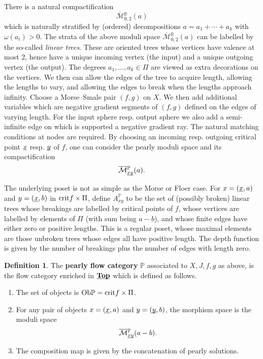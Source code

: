 \documentclass[reqno, 10pt]{amsart}
\numberwithin{equation}{section}
\numberwithin{equation}{section}
\theoremstyle{definition}
\newtheorem{defn}[thm]{Definition}
\theoremstyle{remark}
\newcommand{\beqn}{\begin{equation*}}
\newcommand{\eeqn}{\end{equation*}}
\newcommand{\ov}{\overline}
\newcommand{\mb}{\mathbb}
\newcommand{\mc}{\mathcal}
\newcommand{\uds}[1]{\underline{\smash{#1}}}
\begin{document}
There is a natural compactification 
\beqn
\ov{\mc M}{}_{0,2}^{\mb R}(a)
\eeqn
which is naturally stratified by (ordered) decompositions $a = a_1 + \cdots + a_k$ with $\omega(a_i)>0$. The strata of the above moduli space $\ov{\mc M}{}_{0,2}^{\mb R}(a)$ can be labelled by the so-called {\it linear trees}. These are oriented trees whose vertices have valence at most 2, hence have a unique incoming vertex (the input) and a unique outgoing vertex (the output). The degrees $a_1, \ldots, a_k\in \Pi$ are viewed as extra decorations on the vertices. We then can allow the edges of the tree to acquire length, allowing the lengths to vary, and allowing the edges to break when the lengths approach infinity. Choose a Morse--Smale pair $(f, g)$ on $X$. We then add additional variables which are negative gradient segments of $(f, g)$ defined on the edges of varying length. For the input sphere resp. output sphere we also add a semi-infinite edge on which is supported a negative gradient ray. The natural matching conditions at nodes are required. By choosing an incoming resp. outgoing critical point $\uds x$ resp. $\uds y$ of $f$, one can consider the pearly moduli space and its compactification 
\beqn
\ov{\mc M}{}_{\uds x\uds y}^{\mb P} (a).
\eeqn

The underlying poset is not as simple as the Morse or Floer case. For $x = (\uds x, a)$ and $y = (\uds x, b)$ in ${\rm crit} f \times \Pi$, define $A_{xy}^{\mb P}$ to be the set of (possibly broken) linear trees   whose breakings are labelled by critical points of $f$, whose vertices are labelled by elements of $\Pi$ (with sum being $a-b$), and whose finite edges have either zero or positive lengths. This is a regular poset, whose maximal elements are those unbroken trees whose edges all have positive length. The depth function is given by the number of breakings plus the number of edges with length zero.





\begin{defn}
The {\bf pearly flow category} $\mb{P}$ associated to $X, J, f, g$ as above, is the flow category enriched in $\uds{\bf Top}$ which is defined as follows. 
\begin{enumerate}
\item The set of objects is ${\rm Ob}\mb{P} = {\rm crit} f \times \Pi$.

\item For any pair of objects $x = (\uds x, a)$ and $y = (\uds y, b)$, the morphism space is the moduli space
\beqn
\ov{\mc M}{}_{\uds x \uds y}^{\mb P} (a-b).
\eeqn

\item The composition map is given by the concatenation of pearly solutions. 
\end{enumerate}
\end{defn}
\end{document}
